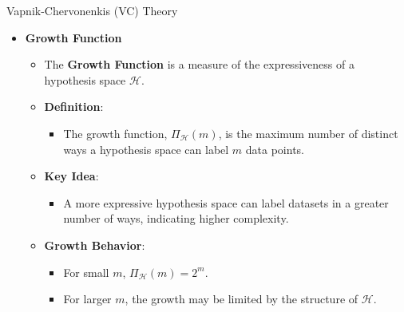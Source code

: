 \documentclass[
  ignorenonframetext,
]{beamer}
\providecommand{\tightlist}{%
  \setlength{\itemsep}{0pt}\setlength{\parskip}{0pt}}\usepackage{longtable,booktabs,array}
\begin{document}
\begin{frame}{Vapnik-Chervonenkis (VC) Theory}
\label{vapnik-chervonenkis-vc-theory}
\begin{itemize}
\tightlist
\item
  \textbf{Growth Function}

  \begin{itemize}
  \tightlist
  \item
    The \textbf{Growth Function} is a measure of the expressiveness of a
    hypothesis space \(\mathcal{H}\).
  \item
    \textbf{Definition}:

    \begin{itemize}
    \tightlist
    \item
      The growth function, \(\Pi_{\mathcal{H}}(m)\), is the maximum
      number of distinct ways a hypothesis space can label \(m\) data
      points.
    \end{itemize}
  \item
    \textbf{Key Idea}:

    \begin{itemize}
    \tightlist
    \item
      A more expressive hypothesis space can label datasets in a greater
      number of ways, indicating higher complexity.
    \end{itemize}
  \item
    \textbf{Growth Behavior}:

    \begin{itemize}
    \tightlist
    \item
      For small \(m\), \(\Pi_{\mathcal{H}}(m) = 2^m\).
    \item
      For larger \(m\), the growth may be limited by the structure of
      \(\mathcal{H}\).
    \end{itemize}
  \end{itemize}
\end{itemize}
\end{frame}
\end{document}
